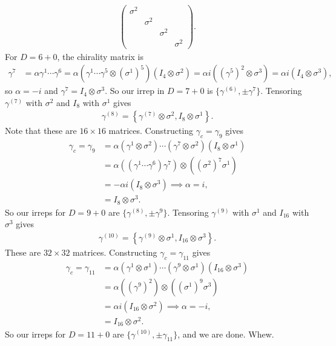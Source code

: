 \documentclass[11pt]{article}
\begin{document}
\begin{eexample}
\begin{align*}
\begin{pmatrix}
            \sigma^2 & & &\\
             & \sigma^2 & &\\
             & & \sigma^2 & \\
             & & & \sigma^2
        \end{pmatrix}.
    \end{align*}
    For $D = 6 + 0$, the chirality matrix is
    \begin{align*}
        \gamma^7 & = \alpha \gamma^1 \cdots \gamma^6
        = \alpha (\gamma^1 \cdots \gamma^5 \otimes (\sigma^1)^5)(I_4 \otimes \sigma^2)
        = \alpha i((\gamma^5)^2 \otimes \sigma^3)
        = \boxed{\alpha i (I_4 \otimes \sigma^3),}
    \end{align*}
    so $\alpha = -i$ and $\gamma^7 = I_4 \otimes \sigma^3$.
    So our irrep in $D = 7 + 0$ is $\{ \gamma^{(6)}, \pm \gamma^7 \}$.
    Tensoring $\gamma^{(7)}$ with $\sigma^2$ and $I_8$ with $\sigma^1$
    gives
    \begin{align*}
        \gamma^{(8)} = \left\{ \gamma^{(7)} \otimes \sigma^2, I_8 \otimes \sigma^1 \right\}.
    \end{align*}
    Note that these are $16 \times 16$ matrices. Constructing $\gamma_c = \gamma_9$ gives
    \begin{align*}
        \gamma_c = \gamma_9 & = \alpha (\gamma^1 \otimes \sigma^2)\cdots(\gamma^7 \otimes \sigma^2)(I_8 \otimes \sigma^1)\\
        & = \alpha ((\gamma^1 \cdots \gamma^6) \gamma^7 ) \otimes ((\sigma^2)^7 \sigma^1)\\
        & = - \alpha i (I_8 \otimes \sigma^3) \implies \alpha = i,\\
        & = \boxed{I_8 \otimes \sigma^3.}
    \end{align*}
    So our irreps for $D = 9 + 0$ are $\{ \gamma^{(8)}, \pm \gamma^9 \}$.
    Tensoring $\gamma^{(9)}$ with $\sigma^1$ and $I_{16}$ with $\sigma^3$
    gives
    \begin{align*}
        \gamma^{(10)} =  \left\{ \gamma^{(9)} \otimes \sigma^1, I_{16} \otimes \sigma^3 \right\}.
    \end{align*}
    These are $32 \times 32$ matrices. Constructing $\gamma_c = \gamma_{11}$
    gives
    \begin{align*}
        \gamma_c = \gamma_{11} & = \alpha (\gamma^1 \otimes \sigma^1)\cdots(\gamma^9 \otimes \sigma^1)(I_{16} \otimes \sigma^3)\\
        & = \alpha ((\gamma^9)^2) \otimes ((\sigma^1)^9 \sigma^3)\\
        & = \alpha i (I_{16} \otimes \sigma^2) \implies \alpha = -i,\\
        & = \boxed{I_{16} \otimes \sigma^2.}
    \end{align*}
    So our irreps for $D = 11 + 0$ are $\{ \gamma^{(10)}, \pm \gamma_{11} \}$,
    and we are done. Whew.
\end{eexample}
\end{document}

